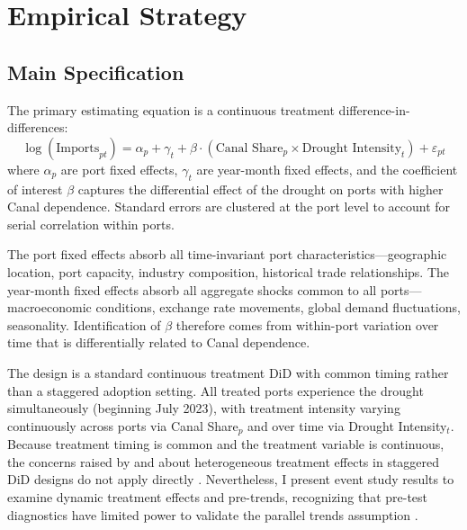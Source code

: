 \documentclass[12pt]{article}
\begin{document}



\section{Empirical Strategy}
\label{sec:strategy}

\subsection{Main Specification}

The primary estimating equation is a continuous treatment difference-in-differences:
\begin{equation}
    \log(\text{Imports}_{pt}) = \alpha_p + \gamma_t + \beta \cdot (\text{Canal Share}_p \times \text{Drought Intensity}_t) + \varepsilon_{pt}
\label{eq:main}
\end{equation}
where $\alpha_p$ are port fixed effects, $\gamma_t$ are year-month fixed effects, and the coefficient of interest $\beta$ captures the differential effect of the drought on ports with higher Canal dependence. Standard errors are clustered at the port level to account for serial correlation within ports.

The port fixed effects absorb all time-invariant port characteristics---geographic location, port capacity, industry composition, historical trade relationships. The year-month fixed effects absorb all aggregate shocks common to all ports---macroeconomic conditions, exchange rate movements, global demand fluctuations, seasonality. Identification of $\beta$ therefore comes from within-port variation over time that is differentially related to Canal dependence.

The design is a standard continuous treatment DiD with common timing rather than a staggered adoption setting. All treated ports experience the drought simultaneously (beginning July 2023), with treatment intensity varying continuously across ports via Canal Share$_p$ and over time via Drought Intensity$_t$. Because treatment timing is common and the treatment variable is continuous, the concerns raised by \citet{goodman2021difference} and \citet{dechaisemartin2020two} about heterogeneous treatment effects in staggered DiD designs do not apply directly \citep{roth2023s}. Nevertheless, I present event study results to examine dynamic treatment effects and pre-trends, recognizing that pre-test diagnostics have limited power to validate the parallel trends assumption \citep{roth2022pretest}.
\end{document}
